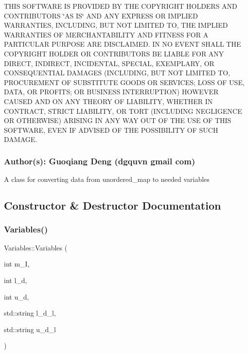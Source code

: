 T\+H\+IS S\+O\+F\+T\+W\+A\+RE IS P\+R\+O\+V\+I\+D\+ED BY T\+HE C\+O\+P\+Y\+R\+I\+G\+HT H\+O\+L\+D\+E\+RS A\+ND C\+O\+N\+T\+R\+I\+B\+U\+T\+O\+RS \char`\"{}\+A\+S I\+S\char`\"{} A\+ND A\+NY E\+X\+P\+R\+E\+SS OR I\+M\+P\+L\+I\+ED W\+A\+R\+R\+A\+N\+T\+I\+ES, I\+N\+C\+L\+U\+D\+I\+NG, B\+UT N\+OT L\+I\+M\+I\+T\+ED TO, T\+HE I\+M\+P\+L\+I\+ED W\+A\+R\+R\+A\+N\+T\+I\+ES OF M\+E\+R\+C\+H\+A\+N\+T\+A\+B\+I\+L\+I\+TY A\+ND F\+I\+T\+N\+E\+SS F\+OR A P\+A\+R\+T\+I\+C\+U\+L\+AR P\+U\+R\+P\+O\+SE A\+RE D\+I\+S\+C\+L\+A\+I\+M\+ED. IN NO E\+V\+E\+NT S\+H\+A\+LL T\+HE C\+O\+P\+Y\+R\+I\+G\+HT H\+O\+L\+D\+ER OR C\+O\+N\+T\+R\+I\+B\+U\+T\+O\+RS BE L\+I\+A\+B\+LE F\+OR A\+NY D\+I\+R\+E\+CT, I\+N\+D\+I\+R\+E\+CT, I\+N\+C\+I\+D\+E\+N\+T\+AL, S\+P\+E\+C\+I\+AL, E\+X\+E\+M\+P\+L\+A\+RY, OR C\+O\+N\+S\+E\+Q\+U\+E\+N\+T\+I\+AL D\+A\+M\+A\+G\+ES (I\+N\+C\+L\+U\+D\+I\+NG, B\+UT N\+OT L\+I\+M\+I\+T\+ED TO, P\+R\+O\+C\+U\+R\+E\+M\+E\+NT OF S\+U\+B\+S\+T\+I\+T\+U\+TE G\+O\+O\+DS OR S\+E\+R\+V\+I\+C\+ES; L\+O\+SS OF U\+SE, D\+A\+TA, OR P\+R\+O\+F\+I\+TS; OR B\+U\+S\+I\+N\+E\+SS I\+N\+T\+E\+R\+R\+U\+P\+T\+I\+ON) H\+O\+W\+E\+V\+ER C\+A\+U\+S\+ED A\+ND ON A\+NY T\+H\+E\+O\+RY OF L\+I\+A\+B\+I\+L\+I\+TY, W\+H\+E\+T\+H\+ER IN C\+O\+N\+T\+R\+A\+CT, S\+T\+R\+I\+CT L\+I\+A\+B\+I\+L\+I\+TY, OR T\+O\+RT (I\+N\+C\+L\+U\+D\+I\+NG N\+E\+G\+L\+I\+G\+E\+N\+CE OR O\+T\+H\+E\+R\+W\+I\+SE) A\+R\+I\+S\+I\+NG IN A\+NY W\+AY O\+UT OF T\+HE U\+SE OF T\+H\+IS S\+O\+F\+T\+W\+A\+RE, E\+V\+EN IF A\+D\+V\+I\+S\+ED OF T\+HE P\+O\+S\+S\+I\+B\+I\+L\+I\+TY OF S\+U\+CH D\+A\+M\+A\+GE.

\subsubsection*{Author(s)\+: Guoqiang Deng (dgquvn  gmail  com) }

A class for converting data from unordered\+\_\+map to needed variables 

\subsection{Constructor \& Destructor Documentation}
\mbox{\label{a00642_a94121a99ac19ea779219504de0253c9a}} 
\subsubsection{\texorpdfstring{Variables()}{Variables()}\hspace{0.1cm}{\footnotesize\ttfamily [1/2]}}
{\footnotesize\ttfamily Variables\+::\+Variables (\begin{DoxyParamCaption}\item[{int}]{m\+\_\+I,  }\item[{int}]{l\+\_\+d,  }\item[{int}]{u\+\_\+d,  }\item[{std\+::string}]{l\+\_\+d\+\_\+l,  }\item[{std\+::string}]{u\+\_\+d\+\_\+l }\end{DoxyParamCaption})}

